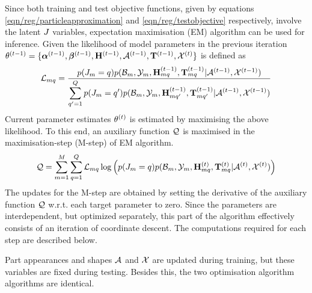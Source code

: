 Since both training and test objective functions, given by equations \ref{eqn/reg/particleapproximation} and \ref{eqn/reg/testobjective} respectively, involve the latent ${J}$ variables, expectation maximisation (EM) algorithm can be used for inference. 
Given the likelihood of model parameters in the previous iteration $\theta^{(t-1)} = \{\bm{\alpha}^{(t-1)},\bm{\beta}^{(t-1)},\mathbf{H}^{(t-1)},\mathcal{A}^{(t-1)},\mathbf{T}^{(t-1)},\mathcal{X}^{(t)}\}$ is defined as
\begin{equation}
	\mathcal{L}_{mq} = \frac{p({J}_{m} = q)p(\mathcal{B}_m,\mathcal{Y}_m,\mathbf{H}^{(t-1)}_{mq},\mathbf{T}^{(t-1)}_{mq}|\mathcal{A}^{(t-1)},\mathcal{X}^{(t-1)})}{\displaystyle\sum_{q' = 1}^{Q} p({J}_{m}  =  q')p(\mathcal{B}_m,\mathcal{Y}_m,\mathbf{H}^{(t-1)}_{mq'},\mathbf{T}^{(t-1)}_{mq'}|\mathcal{A}^{(t-1)},\mathcal{X}^{(t-1)})} 
\end{equation}
Current parameter estimates $\theta^{(t)}$ is estimated by maximising the above likelihood. To this end, an auxiliary function $\mathcal{Q}$ is maximised in the maximisation-step (M-step) of EM algorithm.  
\begin{equation}
	\mathcal{Q} = \displaystyle\sum_{m=1}^M \displaystyle\sum_{q = 1}^{Q} \mathcal{L}_{mq} \log \left( p({J}_{m} = q)p(\mathcal{B}_m,\mathcal{Y}_m,\mathbf{H}^{(t)}_{mq},\mathbf{T}^{(t)}_{mq}|\mathcal{A}^{(t)},\mathcal{X}^{(t)}) \right)
	\label{eqn/reg/auxiliary}
\end{equation}
The updates for the M-step are obtained by setting the derivative of the auxiliary function $\mathcal{Q}$ w.r.t. each target parameter to zero. Since the parameters are interdependent, but optimized separately, this part of the algorithm effectively consists of an iteration of coordinate descent. The computations required for each step are described below.

Part appearances and shapes $\mathcal{A}$ and $\mathcal{X}$ are updated during training, but these variables are fixed during testing. Besides this, the two optimisation algorithm algorithms are identical. 


